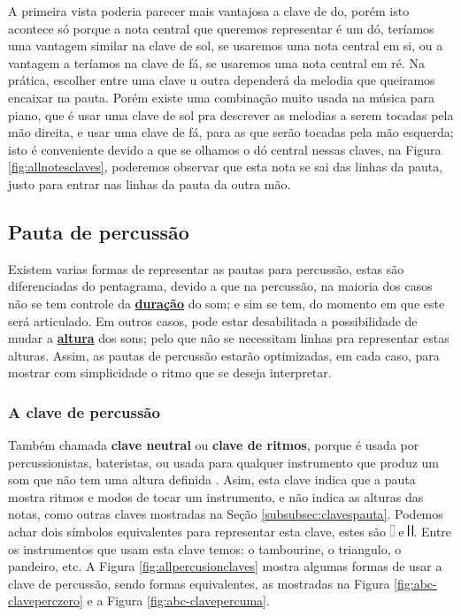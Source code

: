 A primeira vista poderia parecer mais vantajosa a clave de do, 
porém isto acontece só porque a nota central que queremos representar é um dó,
teríamos uma vantagem similar na clave de sol, se usaremos uma nota central em si,
ou a vantagem a teríamos na clave de fá, se usaremos uma nota central em ré. 
Na prática, escolher entre
uma clave u outra dependerá da melodia que queiramos encaixar na pauta.
Porém existe uma combinação muito usada na música para piano, 
que é usar uma clave de sol pra descrever as melodias a serem tocadas pela mão direita,
e usar uma clave de fá, para as que serão tocadas pela mão esquerda; 
isto é conveniente devido a que se olhamos o dó central nessas claves, 
na Figura \ref{fig:allnotesclaves}, 
poderemos observar que esta nota se sai das linhas da pauta, 
justo para entrar nas linhas da pauta da outra mão.

\subsection{Pauta de percussão}

Existem varias formas de representar as pautas para percussão, 
estas são diferenciadas do pentagrama, devido a que na percussão, 
na maioria dos casos não se tem controle da \hyperref[sec:pos:Duracion]{\textbf{duração}} do som;
e sim se tem, do momento em que este será articulado. Em outros casos,
pode estar desabilitada a possibilidade de mudar a \hyperref[sec:pos:Altura]{\textbf{altura}} dos sons;
pelo que não se necessitam linhas pra representar estas alturas.
Assim, as pautas de percussão estarão optimizadas, em cada caso, 
para mostrar com simplicidade o ritmo que se deseja interpretar.

\subsubsection{A clave de percussão}
Também chamada \textbf{clave neutral} ou \textbf{clave de ritmos}, 
porque é usada por percussionistas, bateristas, 
ou usada para qualquer instrumento que produz um som que não tem uma altura definida \cite[pp. 51]{harnum2009basic}.
Asim, esta clave indica que a pauta mostra ritmos e modos de tocar um instrumento, 
e não indica as alturas das notas, 
como outras claves mostradas na Seção \ref{subsubsec:clavespauta}.
Podemos achar dois símbolos equivalentes para representar esta clave, 
estes são \includegraphics[height=10pt]{chapters/cap-musica-basica/P1-clef.eps}
e \includegraphics[height=10pt]{chapters/cap-musica-basica/P2-clef.eps}.
Entre os instrumentos que usam esta clave temos:
o tambourine, o triangulo, o pandeiro, etc.
A Figura \ref{fig:allpercusionclaves} mostra algumas formas de usar a clave de percussão,
sendo formas equivalentes, as mostradas na Figura \ref{fig:abc-claveperczero} e a Figura \ref{fig:abc-clavepercuma}.

